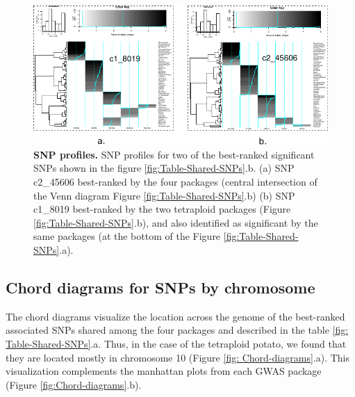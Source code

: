 \documentclass{article}
\begin{document}
\begin{figure}[H]
\begin{centering}
\includegraphics{images/paper-heat-maps}
\par\end{centering}
\caption{\textbf{\scriptsize{}SNP profiles. }{\scriptsize{}SNP profiles for
two of the best-ranked significant SNPs shown in the figure \ref{fig:Table-Shared-SNPs}.b.
(a) SNP c2\_45606 best-ranked by the four packages (central intersection
of the Venn diagram Figure \ref{fig:Table-Shared-SNPs}.b) (b) SNP
c1\_8019 best-ranked by the two tetraploid packages (Figure \ref{fig:Table-Shared-SNPs}.b),
and also identified as significant by the same packages (at the bottom
of the Figure \ref{fig:Table-Shared-SNPs}.a). \label{fig:SNP-profiles}}}
\end{figure}

\subsection{Chord diagrams for SNPs by chromosome}
The chord diagrams visualize the location across the genome of the best-ranked associated SNPs shared among the four packages and described in the table \ref{fig: Table-Shared-SNPs}.a.  Thus, in the case of the tetraploid potato, we found that they are located mostly in chromosome 10  (Figure \ref{fig: Chord-diagrams}.a). This visualization complements the manhattan plots from each GWAS package (Figure \ref{fig:Chord-diagrams}.b).
\end{document}
